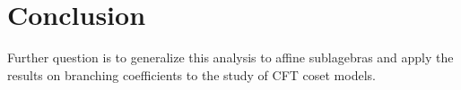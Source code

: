 \documentclass[12pt]{article}
\newtheorem{theorem}{Theorem}
\newtheorem{statement}{Statement}
\newcommand{\gf}{\mathfrak{g}}
\newcommand{\nfp}{\mathfrak{n}^{+}}
\newcommand{\nfm}{\mathfrak{n}^{-}}
\newcommand{\af}{\mathfrak{a}}
\newcommand{\hf}{\mathfrak{h}}
\newcommand{\bff}{\mathfrak{b}}
\begin{document}
\section*{Conclusion}
\label{sec:conclusion}
Further question is to generalize this analysis to affine sublagebras and apply the results on branching coefficients to the study of CFT coset models. 

{}

\end{document}
